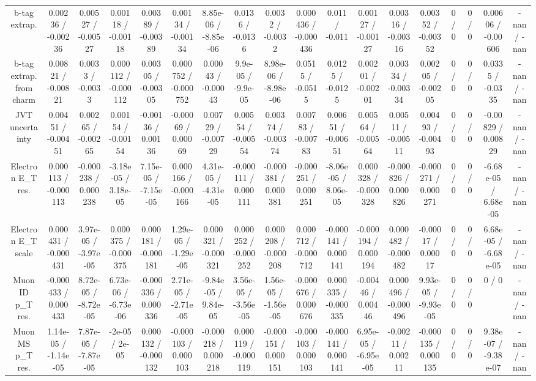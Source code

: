 \documentclass[10pt]{article}
\begin{document}
\begin{table}[htbp]
\begin{center}
\begin{tabular}{|c|c|c|c|c|c|c|c|c|c|c|c|c|c|c|c|c|c|}
  b-tag extrap. & 0.00236 / -0.00236 & 0.00527 / -0.00527 & 0.00118 / -0.00118 & 0.00389 / -0.00389 & 0.00134 / -0.00134 & 8.85e-06 / -8.85e-06 & 0.0136 / -0.0136 & 0.0032 / -0.0032 & 0.000436 / -0.000436 & 0.011 / -0.011 & 0.00127 / -0.00127 & 0.00316 / -0.00316 & 0.00352 / -0.00352 & 0 / 0 & 0 / 0 & 0.00606 / -0.00606 & -nan / -nan \\ 
  b-tag extrap. from charm & 0.00821 / -0.00821 & 0.0033 / -0.0033 & 0.000112 / -0.000112 & 0.00305 / -0.00305 & 0.000752 / -0.000752 & 0.00043 / -0.00043 & 9.9e-05 / -9.9e-05 & 8.98e-06 / -8.98e-06 & 0.0515 / -0.0515 & 0.0125 / -0.0125 & 0.00201 / -0.00201 & 0.00334 / -0.00334 & 0.00205 / -0.00205 & 0 / 0 & 0 / 0 & 0.0335 / -0.0335 & -nan / -nan \\ 
  JVT uncertainty & 0.00451 / -0.00451 & 0.00265 / -0.00265 & 0.00154 / -0.00154 & -0.00136 / 0.00136 & -0.00069 / 0.00069 & 0.00729 / -0.00729 & 0.00554 / -0.00554 & 0.00374 / -0.00374 & 0.00783 / -0.00783 & 0.00651 / -0.00651 & 0.00564 / -0.00564 & 0.00511 / -0.00511 & 0.00493 / -0.00493 & 0 / 0 & 0 / 0 & -0.00829 / 0.00829 & -nan / -nan \\ 
  Electron E_{T} res. & 0.000113 / -0.000113 & -0.000238 / 0.000238 & -3.18e-05 / 3.18e-05 & 7.15e-05 / -7.15e-05 & 0.000166 / -0.000166 & 4.31e-05 / -4.31e-05 & -0.000111 / 0.000111 & -0.000381 / 0.000381 & -0.000251 / 0.000251 & -8.06e-05 / 8.06e-05 & 0.000328 / -0.000328 & -0.000826 / 0.000826 & -0.000271 / 0.000271 & 0 / 0 & 0 / 0 & -6.68e-05 / 6.68e-05 & -nan / -nan \\ 
  Electron E_{T} scale & 0.000431 / -0.000431 & 3.97e-05 / -3.97e-05 & 0.000375 / -0.000375 & 0.000181 / -0.000181 & 1.29e-05 / -1.29e-05 & 0.000321 / -0.000321 & 0.000252 / -0.000252 & 0.000208 / -0.000208 & 0.000712 / -0.000712 & -0.000141 / 0.000141 & -0.000194 / 0.000194 & 0.000482 / -0.000482 & -0.00017 / 0.00017 & 0 / 0 & 0 / 0 & 6.68e-05 / -6.68e-05 & -nan / -nan \\ 
  Muon ID p_{T} res. & -0.000433 / 0.000433 & 8.72e-05 / -8.72e-05 & 6.73e-06 / -6.73e-06 & -0.000336 / 0.000336 & 2.71e-05 / -2.71e-05 & -9.84e-05 / 9.84e-05 & 3.56e-05 / -3.56e-05 & 1.56e-05 / -1.56e-05 & -0.000676 / 0.000676 & 0.000335 / -0.000335 & -0.00446 / 0.00446 & 0.000496 / -0.000496 & 9.93e-05 / -9.93e-05 & 0 / 0 & 0 / 0 & 0 / 0 & -nan / -nan \\ 
  Muon MS p_{T} res. & 1.14e-05 / -1.14e-05 & 7.87e-05 / -7.87e-05 & -2e-05 / 2e-05 & 0.000132 / -0.000132 & -0.000103 / 0.000103 & -0.000218 / 0.000218 & 0.000119 / -0.000119 & -0.000151 / 0.000151 & -0.000103 / 0.000103 & -0.000141 / 0.000141 & 6.95e-05 / -6.95e-05 & -0.00211 / 0.00211 & -0.000135 / 0.000135 & 0 / 0 & 0 / 0 & 9.38e-07 / -9.38e-07 & -nan / -nan \\ 

\end{tabular}
\end{center}
\end{table}
\end{document}

